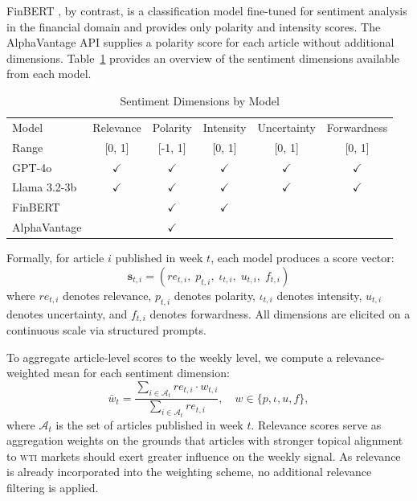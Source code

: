 \documentclass[preprint,12pt,authoryear]{elsarticle}
\newcommand{\wti}{\textsc{wti}}
\newcommand{\gpt}{GPT-4o }
\newcommand{\llama}{Llama 3.2-3b }
\newcommand{\finbert}{FinBERT }
\begin{document}
\finbert, by contrast, is a classification model fine-tuned for 
sentiment analysis in the financial domain and provides only polarity and intensity scores. The AlphaVantage API supplies a polarity score for each article without additional dimensions. 
Table~\ref{tab:dimensions} provides an overview of the sentiment 
dimensions available from each model.


\FloatBarrier
\begin{table}[htbp]
\centering
\caption{Sentiment Dimensions by Model}
\label{tab:dimensions}
\begin{tabular}{lccccc}
\hline
Model & Relevance & Polarity & Intensity & Uncertainty & Forwardness \\
Range & {[}0, 1{]} & {[}-1, 1{]} & {[}0, 1{]} & {[}0, 1{]} & {[}0, 1{]} \\
\hline
\gpt        & $\checkmark$ & $\checkmark$ & $\checkmark$ & $\checkmark$ & $\checkmark$ \\
\llama   & $\checkmark$ & $\checkmark$ & $\checkmark$ & $\checkmark$ & $\checkmark$ \\
\finbert         &              & $\checkmark$ & $\checkmark$ &              &              \\
AlphaVantage    &              & $\checkmark$ &              &              &              \\
\hline
\end{tabular}
\end{table}


Formally, for article $i$ published in week $t$, each model produces a
score vector:
\begin{equation}
    \mathbf{s}_{t,i} = (re_{t,i},\; p_{t,i},\; \iota_{t,i},\; u_{t,i},\; f_{t,i})
\end{equation}
where $re_{t,i}$ denotes relevance, $p_{t,i}$ denotes polarity, $\iota_{t,i}$ denotes intensity,
$u_{t,i}$ denotes uncertainty, and $f_{t,i}$ denotes forwardness.
All dimensions are elicited on a continuous scale via structured
prompts.

To aggregate article-level scores to the weekly level, we compute a relevance-weighted mean for each sentiment dimension:
\begin{equation}
    \bar{w}_{t} = \frac{\sum_{i \in \mathcal{A}_t} re_{t,i} \cdot 
    w_{t,i}}{\sum_{i \in \mathcal{A}_t} re_{t,i}},
    \quad w \in \{p, \iota, u, f\},
    \label{eq:aggregation}
\end{equation}
where $\mathcal{A}_t$ is the set of articles published in week $t$. Relevance scores serve as aggregation weights on the grounds that articles with stronger topical alignment to \wti{} markets should exert greater influence on the weekly signal. As relevance is already incorporated into the weighting scheme, no additional relevance filtering is applied. 
\end{document}
